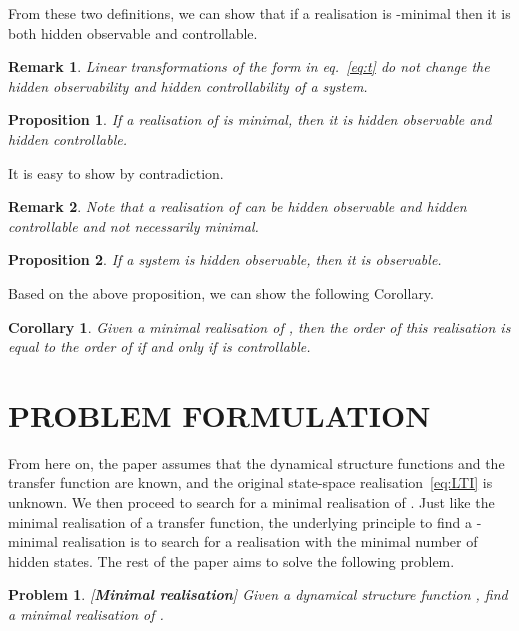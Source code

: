 \documentclass[twocolumn,12pt]{autart}
\theoremstyle{plain}
\newtheorem{proposition}{Proposition}
\newtheorem{corollary}{Corollary}
\newtheorem{remark}{Remark}
\newtheorem{problem}{Problem}
\newenvironment{proof}[1][Proof]{\begin{trivlist} \item[\hskip \labelsep {\bfseries #1}]}{\end{trivlist}}
\begin{document}
From these two definitions, we can show that if a realisation  is -minimal then it is both hidden observable and controllable.

\begin{remark}
Linear transformations of the form  in eq.~\eqref{eq:t} do not change the hidden observability and hidden controllability of a system.
\end{remark}

\begin{proposition}\label{th:hidden}
If a realisation  of  is minimal, then it is hidden observable and hidden controllable.
\end{proposition}
\begin{proof}
It is easy to show by contradiction. 
\end{proof}

\begin{remark}
Note that a realisation  of  can be hidden observable and hidden controllable and not necessarily  minimal. 
\end{remark}

\begin{proposition}\label{th:obserable} 
If a system  is hidden observable, then it is observable.
\end{proposition}

Based on the above proposition, we can show the following Corollary.
\begin{corollary}
Given a minimal realisation  of , then the order of this realisation is equal to the order of  if and only if  is controllable.
\end{corollary}








\section{PROBLEM FORMULATION}\label{se:pf}
From here on, the paper assumes that the dynamical structure functions  and the transfer function  are known, and  the original state-space realisation~\eqref{eq:LTI} is unknown. We then proceed to search for a minimal realisation of . Just like the minimal realisation of a transfer function, the underlying principle to find a -minimal realisation is to search for a realisation with the minimal number of hidden states.  The rest of the paper aims to solve the following problem.

\begin{problem}\label{prob:main}
{\em [}{\bf Minimal  realisation}{\em ]} Given a dynamical structure function , find a minimal realisation  of . 
\end{problem}
\end{document}
